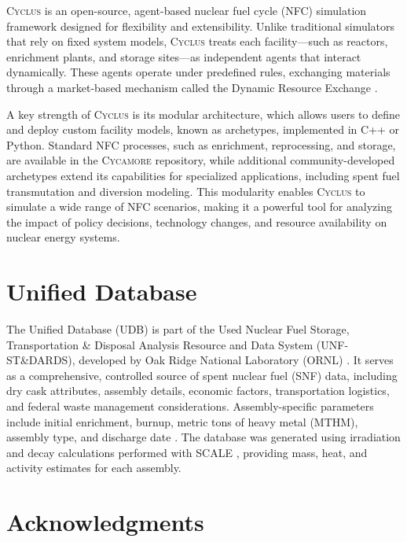 \documentclass{anstrans}
\newcommand{\cycamore}{\textsc{Cycamore}\xspace}
\newcommand{\cyclus}{\textsc{Cyclus}\xspace}
\begin{document}
\cyclus \cite{huff_fundamental_2016} is an open-source, agent-based nuclear fuel cycle (NFC) simulation framework designed for flexibility and extensibility. Unlike traditional simulators that rely on fixed system models, \cyclus treats each facility—such as reactors, enrichment plants, and storage sites—as independent agents that interact dynamically. These agents operate under predefined rules, exchanging materials through a market-based mechanism called the Dynamic Resource Exchange \cite{gidden_methodology_2016}.

A key strength of \cyclus is its modular architecture, which allows users to define and deploy custom facility models, known as archetypes, implemented in C++ or Python. Standard NFC processes, such as enrichment, reprocessing, and storage, are available in the \cycamore \cite{carlsen_cycamore_2014} repository, while additional community-developed archetypes extend its capabilities for specialized applications, including spent fuel transmutation and diversion modeling. This modularity enables \cyclus to simulate a wide range of NFC scenarios, making it a powerful tool for analyzing the impact of policy decisions, technology changes, and resource availability on nuclear energy systems.
\section{Unified Database}

The Unified Database (UDB) is part of the Used Nuclear Fuel Storage, Transportation & Disposal Analysis Resource and Data System (UNF-ST\&DARDS), developed by Oak Ridge National Laboratory (ORNL) \cite{peterson_used_2013}. It serves as a comprehensive, controlled source of spent nuclear fuel (SNF) data, including dry cask attributes, assembly details, economic factors, transportation logistics, and federal waste management considerations. Assembly-specific parameters include initial enrichment, burnup, metric tons of heavy metal (MTHM), assembly type, and discharge date \cite{peterson_fuel_2015}. The database was generated using irradiation and decay calculations performed with SCALE \cite{bowman_scale_2011}, providing mass, heat, and activity estimates for each assembly.

\section{Acknowledgments}
\end{document}
